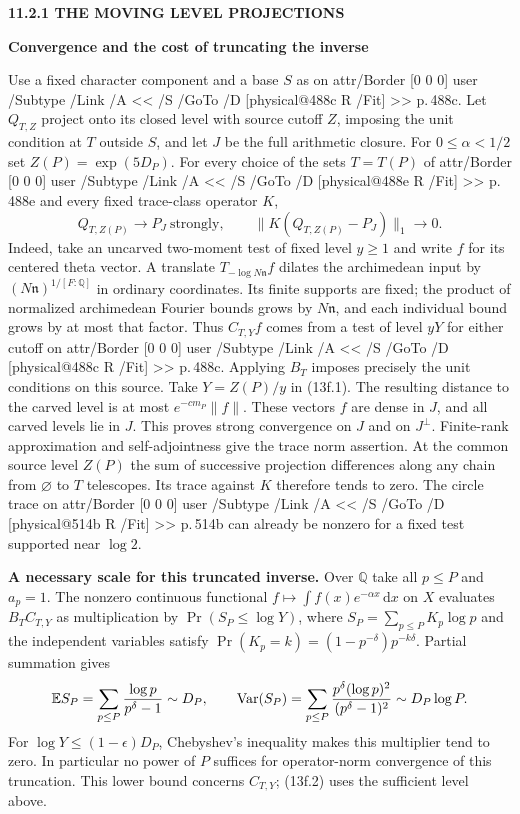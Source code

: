 \documentclass[11pt,letterpaper]{article}
\makeatletter
\newcommand{\rightmarktext}{}
\newcommand{\printfolio}{}
\newcommand{\leaf}[4]{\clearpage\gdef\printfolio{#1}\gdef\rightmarktext{#2}%
  {\small\sffamily\bfseries\color{ink}#3\par}\vspace{3pt}%
  {\LARGE\bfseries #4\par}\vspace{5pt}}
\newcommand{\point}[1]{\par\smallskip\textbf{#1.}\enspace\ignorespaces}
\newcommand{\Q}{\mathbb Q}
\newcommand{\dd}{\,\mathrm d}
\newcommand{\MusicPDFPageRef}[1]{\pdfpageref\csname physical@#1\endcsname\space\space 0 R}
\newcommand{\pagelink}[2]{\leavevmode\pdfstartlink attr{/Border [0 0 0]} user{%
  /Subtype /Link /A << /S /GoTo /D [\MusicPDFPageRef{#1} /Fit] >>}%
  {\color{ink}#2}\pdfendlink}
\newcommand{\pg}[1]{\pagelink{#1}{p.\,#1}}
\makeatother
\begin{document}
\leaf{488f}{Growing sets of primes}{11.2.1 \quad THE MOVING LEVEL PROJECTIONS}{Convergence and the cost of truncating the inverse}
Use a fixed character component and a base $S$ as on \pg{488c}.
Let $Q_{T,Z}$ project onto its closed level with source cutoff $Z$,
imposing the unit condition at $T$ outside $S$, and let $J$ be the full
arithmetic closure. For $0\le\alpha<1/2$ set $Z(P)=\exp(5D_P)$.
For every choice of the sets $T=T(P)$
of \pg{488e} and every fixed trace-class operator $K$,
\[
       Q_{T,Z(P)}\longrightarrow P_J\ \text{strongly},\qquad
       \|K(Q_{T,Z(P)}-P_J)\|_1\longrightarrow0 .
 \tag{13f.2}
\]
Indeed, take an uncarved two-moment test of fixed level $y\ge1$
and write $f$ for its centered theta vector. A translate
$T_{-\log N\mathfrak n}f$ dilates the archimedean input by
$(N\mathfrak n)^{1/[F:\Q]}$ in ordinary coordinates. Its finite
supports are fixed; the product of normalized archimedean Fourier
bounds grows by $N\mathfrak n$, and each individual bound grows by
at most that factor. Thus $C_{T,Y}f$ comes from a test of level $yY$
for either cutoff on \pg{488c}. Applying $B_T$ imposes precisely the
unit conditions on this source. Take $Y=Z(P)/y$ in (13f.1). The resulting
distance to the carved level is at most $e^{-c m_P}\|f\|$. These
vectors $f$ are dense in $J$, and all carved levels lie in $J$.
This proves strong convergence on $J$ and on $J^\perp$. Finite-rank
approximation and self-adjointness give the trace norm assertion.
At the common source level $Z(P)$ the sum of successive projection
differences along any chain from $\varnothing$ to $T$ telescopes.
Its trace against $K$ therefore tends to zero. The circle trace on
\pg{514b} can already be nonzero for a fixed test supported near $\log 2$.

\point{A necessary scale for this truncated inverse}
Over $\Q$ take all $p\le P$ and $a_p=1$. The nonzero continuous
functional $f\mapsto\int f(x)e^{-\alpha x}\dd x$ on $X$ evaluates
$B_T C_{T,Y}$ as multiplication by $\Pr(S_P\le\log Y)$, where
$S_P=\sum_{p\le P}K_p\log p$ and the independent variables satisfy
$\Pr(K_p=k)=(1-p^{-\delta})p^{-k\delta}$. Partial summation gives
\[
 \mathbb E S_P=\sum_{p\le P}\frac{\log p}{p^\delta-1}\sim D_P,\qquad
 {\rm Var}(S_P)=\sum_{p\le P}\frac{p^\delta(\log p)^2}{(p^\delta-1)^2}
       \sim D_P\log P .
\]
For $\log Y\le(1-\epsilon)D_P$, Chebyshev's inequality makes this
multiplier tend to zero. In particular no power of $P$ suffices for
operator-norm convergence of this truncation. This lower bound concerns
$C_{T,Y}$; (13f.2) uses the sufficient level above.
\end{document}
